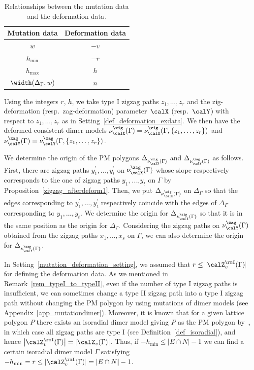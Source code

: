 \begin{setting}
\begin{table}[h!]\centering
\begin{tabular}{|c|c|}
\hline
Mutation data&Deformation data \\ \hline
$w$&$-v$ \\ \hline
$h_{\min}$&$-r$\\ \hline
$h_{\max}$&$h$ \\ \hline
$\width(\Delta_\Gamma,w)$&$n$ \\ \hline
\end{tabular}

\caption{Relationships between the mutation data and the deformation data.}\label{mutation_deformation_data}
\end{table}

Using the integers $r$, $h$, we take type I zigzag paths $z_1,\dots,z_r$ and the zig-deformation (resp.\ zag-deformation) parameter~$\calX$ (resp.~$\calY$) with respect to $z_1,\dots,z_r$ as in Setting~\ref{def_deformation_exdata}.
We then have the deformed consistent dimer models $\nu^\zig_\calX(\Gamma)=\nu^\zig_\calX(\Gamma, \{z_1,\dots,z_r\})$
and $\nu^\zag_\calY(\Gamma)=\nu^\zag_\calY(\Gamma, \{z_1,\dots,z_r\})$.

We determine the origin of the PM polygons $\Delta_{\nu^\zig_\calX(\Gamma)}$ and $\Delta_{\nu^\zag_\calY(\Gamma)}$ as follows.
First, there are zigzag paths $y_1^\prime,\dots,y_t^\prime$ on $\nu^\zig_\calX(\Gamma)$ whose slope respectively corresponds to the one of zigzag paths $y_1,\dots, y_t$ on $\Gamma$ by Proposition~\ref{zigzag_afterdeform1}.
Then, we put $\Delta_{\nu^\zig_\calX(\Gamma)}$ on $\Delta_\Gamma$ so that the edges corresponding to $y_1^\prime,\dots,y_t^\prime$ respectively coincide with the edges of $\Delta_\Gamma$ corresponding to $y_1,\dots,y_t$.
We determine the origin for $\Delta_{\nu^\zig_\calX(\Gamma)}$ so that it is in the same position as the origin for $\Delta_\Gamma$.
Considering the zigzag paths on $\nu^\zag_\calY(\Gamma)$ obtained from the zigzag paths $x_1,\dots,x_s$ on $\Gamma$,
we can also determine the origin for $\Delta_{\nu^\zag_\calY(\Gamma)}$.
\end{setting}

\begin{Remark}
\label{rem_typeI_isoradial}
In Setting~\ref{mutation_deformation_setting}, we assumed that $r\le|\calZ_v^\rmI(\Gamma)|$ for defining the deformation data.
As we mentioned in Remark~\ref{rem_typeI_to_typeII}, even if the number of type I zigzag paths is insufficient,
we can sometimes change a type II zigzag path into a type I zigzag path without changing the PM polygon by using mutations of dimer models (see Appendix~\ref{app_mutationdimer}).
Moreover, it is known that for a given lattice polygon $P$ there exists an isoradial dimer model giving $P$ as the PM polygon by~\cite{Gul}, in which case all zigzag paths are type I (see Definition~\ref{def_isoradial}), and hence $\big|\calZ_v^\rmI(\Gamma)\big|=|\calZ_v(\Gamma)|$.
Thus, if $-h_{\min}\le|E\cap N|-1$ we can find a certain isoradial dimer model $\Gamma$ satisfying $-h_{\min}=r\le|\calZ_v^{\rmI}(\Gamma)|=|E\cap N|-1$.
\end{Remark}

